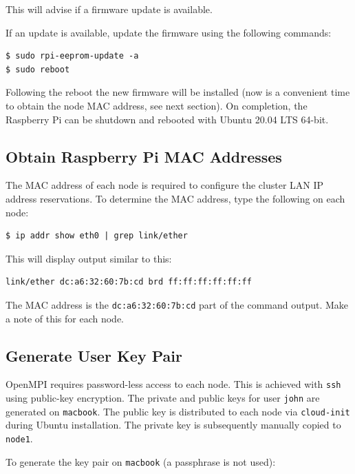 \documentclass{report}
\begin{document}
This will advise if a firmware update is available.

If an update is available, update the firmware using the following commands:

\lstset{style=type}
\begin{lstlisting}[]
$ sudo rpi-eeprom-update -a
$ sudo reboot
\end{lstlisting}

Following the reboot the new firmware will be installed (now is a convenient time to obtain the node MAC address, see next section). On completion, the Raspberry Pi can be shutdown and rebooted with Ubuntu 20.04 LTS 64-bit. 


%
%
\subsection{Obtain Raspberry Pi MAC Addresses}

The MAC address of each node is required to configure the cluster LAN IP address reservations. To determine the MAC address, type the following on each node:

\lstset{style=type}
\begin{lstlisting}[]
$ ip addr show eth0 | grep link/ether 
\end{lstlisting}

This will display output similar to this:

\lstset{style=term}
\begin{lstlisting}[]
link/ether dc:a6:32:60:7b:cd brd ff:ff:ff:ff:ff:ff
\end{lstlisting}

The MAC address is the \verb|dc:a6:32:60:7b:cd| part of the command output. Make a note of this for each node.


%
%
\subsection{Generate User Key Pair}

OpenMPI requires password-less access to each node. This is achieved with \verb|ssh| using public-key encryption. The private and public keys for user \verb|john| are generated on \verb|macbook|. The public key is distributed to each node via \verb|cloud-init| during Ubuntu installation. The private key is subsequently manually copied to \verb|node1|.

To generate the key pair on \verb|macbook| (a passphrase is not used):
\end{document}
